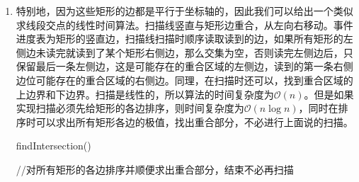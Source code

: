 \documentclass[12pt,a4paper]{article}
\makeatletter
\newtheorem*{solution}{Solution}
\theoremstyle{definition}
\renewenvironment{solution}[1][Solution] {\par\pushQED{\qed}\normalfont\topsep6\p@\@plus6\p@\relax\trivlist\item[\hskip\labelsep\bfseries#1\@addpunct{.}]\ignorespaces}{\popQED\endtrivlist\@endpefalse} \makeatother
\makeatother
\begin{document}
\begin{enumerate}
\begin{solution}
	特别地，因为这些矩形的边都是平行于坐标轴的，因此我们可以给出一个类似求线段交点的线性时间算法。扫描线竖直与矩形边重合，从左向右移动。事件进度表为矩形的竖直边，扫描线扫描时顺序读取读到的边，如果所有矩形的左侧边未读完就读到了某个矩形右侧边，那么交集为空，否则读完左侧边后，只保留最后一条左侧边，这是可能存在的重合区域的左侧边，读到的第一条右侧边位可能存在的重合区域的右侧边。同理，在扫描时还可以，找到重合区域的上边界和下边界。扫描是线性的，所以算法的时间复杂度为$\mathcal{O}(n)$。但是如果实现扫描必须先给矩形的各边排序，则时间复杂度为$\mathcal{O}(n\log n)$，同时在排序时可以求出所有矩形各边的极值，找出重合部分，不必进行上面说的扫描。
	\begin{algorithm}
		\caption{findIntersection()}
		//对所有矩形的各边排序并顺便求出重合部分，结束不必再扫描\\
	\end{algorithm}
\end{solution}
\end{enumerate}

\end{document}
